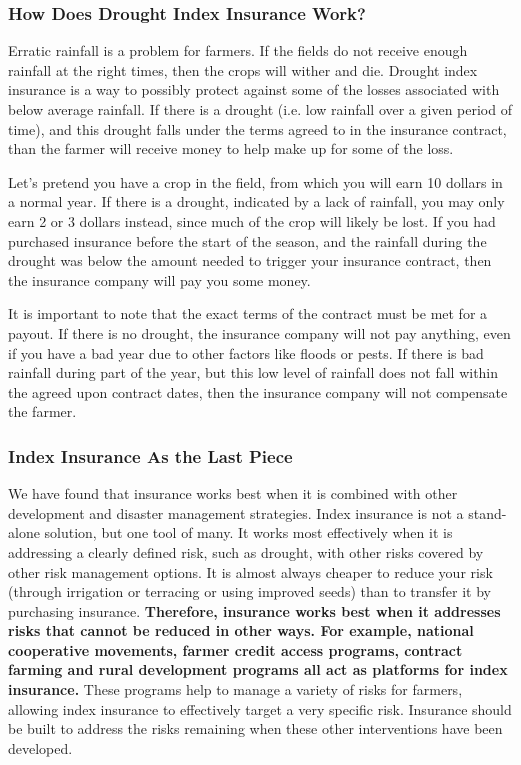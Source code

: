 \documentclass[letterpaper,10pt,english]{sphinxmanual}
\begin{document}
\subsubsection{How Does Drought Index Insurance Work?}
\label{whatisindexinsurance/weather/weatherindexinsurance_en:how-does-drought-index-insurance-work}
Erratic rainfall is a problem for farmers. If the fields do not receive enough rainfall at the right times, then the crops will wither and die. Drought index insurance is a way to possibly protect against some of the losses associated with below average rainfall. If there is a drought (i.e. low rainfall over a given period of time), and this drought falls under the terms agreed to in the insurance contract, than the farmer will receive money to help make up for some of the loss.

Let's pretend you have a crop in the field, from which you will earn 10 dollars in a normal year. If there is a drought, indicated by a lack of rainfall, you may only earn 2 or 3 dollars instead, since much of the crop will likely be lost. If you had purchased insurance before the start of the season, and the rainfall during the drought was below the amount needed to trigger your insurance contract, then the insurance company will pay you some money.

It is important to note that the exact terms of the contract must be met for a payout.  If there is no drought, the insurance company will not pay anything, even if you have a bad year due to other factors like floods or pests. If there is bad rainfall during part of the year, but this low level of rainfall does not fall within the agreed upon contract dates, then the insurance company will not compensate the farmer.


\subsubsection{Index Insurance As the Last Piece}
\label{whatisindexinsurance/weather/weatherindexinsurance_en:index-insurance-as-the-last-piece}
We have found that insurance works best when it is combined with other development and disaster management strategies. Index insurance is not a stand-alone solution, but one tool of many. It works most effectively when it is addressing a clearly defined risk, such as drought, with other risks covered by other risk management options. It is almost always cheaper to reduce your risk (through irrigation or terracing or using improved seeds) than to transfer it by purchasing insurance. \textbf{Therefore, insurance works best when it addresses risks that cannot be reduced in other ways. For example, national cooperative movements, farmer credit access programs, contract farming and rural development programs all act as platforms for index insurance.} These programs help to manage a variety of risks for farmers, allowing index insurance to effectively target a very specific risk. Insurance should be built to address the risks remaining when these other interventions have been developed.
\end{document}
